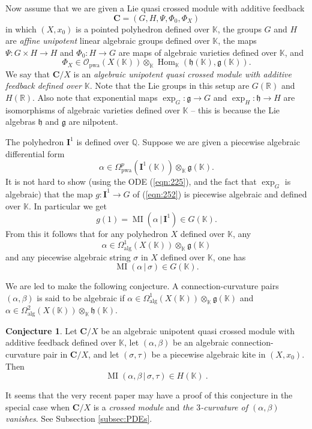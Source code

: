 \documentclass[10pt, a4paper]{amsart}
\theoremstyle{definition}
\newtheorem{conj}[equation]{Conjecture}
\numberwithin{equation}{section}
\newcommand{\opn}{\operatorname}
\newcommand{\mfrak}[1]{\mathfrak{#1}}
\newcommand{\mcal}[1]{\mathcal{#1}}
\newcommand{\mbf}[1]{\mathbf{#1}}
\newcommand{\mrm}[1]{\mathrm{#1}}
\newcommand{\mbb}[1]{\mathbb{#1}}
\renewcommand{\vert}{\, | \,}
\newcommand{\K}{\mbb{K}}
\newcommand{\R}{\mbb{R}}
\newcommand{\g}{\mfrak{g}}
\newcommand{\h}{\mfrak{h}}
\begin{document}
Now assume that we are given a Lie quasi crossed module with additive feedback
\[ \mbf{C}  = (G, H, \Psi, \Phi_0, \Phi_X) \]
in which $(X, x_0)$ is a pointed polyhedron defined over $\K$, 
the groups $G$ and $H$ are {\em affine unipotent} linear algebraic
groups defined over $\K$, the maps
$\Psi : G \times H \to H$ and $\Phi_0 : H \to G$ are maps of algebraic
varieties defined over $\K$, and 
\[ \Phi_X \in \mcal{O}_{\mrm{pwa}}(X(\K)) \otimes_{\K} 
\opn{Hom}_{\K}(\h(\K), \g(\K)). \]
We say that $\mbf{C} / X$ is an {\em algebraic unipotent quasi crossed
module with additive feedback defined over $\K$}. 
Note that the Lie groups in this setup are $G(\R)$ and
$H(\R)$. Also note that exponential maps $\exp_G : \g \to G$ and
$\exp_H : \h \to H$ are isomorphisms of algebraic varieties defined over $\K$
-- this is because the Lie algebras $\h$ and $\g$ are nilpotent.

The polyhedron $\mbf{I}^1$ is defined over $\mbb{Q}$. 
Suppose we are given a piecewise algebraic differential form
\[ \alpha \in \Omega^p_{\mrm{pwa}}(\mbf{I}^1(\K)) \otimes_{\K} \g(\K) . \]
It is not hard to show (using the ODE (\ref{eqn:225}), and the fact that 
$\exp_G$ is algebraic) that the map
$g : \mbf{I}^1 \to G$  of (\ref{eqn:252}) is piecewise algebraic and defined
over $\K$.  In particular we get
\[ g(1) = \opn{MI}(\alpha \vert \mbf{I}^1) \in G(\K) . \]
From this it follows that for any polyhedron $X$ defined over $\K$, any
\[ \alpha \in \Omega^1_{\mrm{alg}}(X(\K)) \otimes_{\K} \g(\K)  \]
and any piecewise algebraic string $\sigma$ in $X$ defined over $\K$, one has
\[ \opn{MI}(\alpha \vert \sigma) \in G(\K) . \]

We are led to make the following conjecture. A connection-curvature pairs
$(\alpha, \beta)$ is said to be algebraic if 
$\alpha \in \Omega^1_{\mrm{alg}}(X(\K)) \otimes_{\K} \g(\K)$ and
$\alpha \in \Omega^2_{\mrm{alg}}(X(\K)) \otimes_{\K} \h(\K)$.

\begin{conj} \label{conj:520}
Let $\mbf{C} / X$ be an algebraic unipotent quasi crossed
module with additive feedback defined over $\K$, let 
$(\alpha, \beta)$ be an algebraic connection-curvature pair in $\mbf{C} / X$, 
and let $(\sigma, \tau)$ be a piecewise algebraic kite in $(X, x_0)$.
Then 
\[ \opn{MI}(\alpha, \beta \vert \sigma, \tau) \in H(\K) \ . \]
\end{conj}

It seems that the very recent paper \cite{BGNT} may have a proof of this
conjecture in the special case when $\mbf{C} / X$ is a {\em crossed module} and 
{\em the $3$-curvature of $(\alpha, \beta)$ vanishes}. See Subsection
\ref{subsec:PDEs}.
\end{document}
